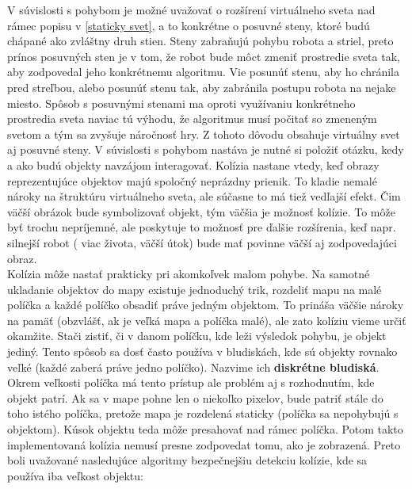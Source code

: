 V súvislosti s pohybom je možné uvažovať o rozšírení virtuálneho sveta nad rámec popisu v \ref{staticky svet}, a to konkrétne o posuvné steny, ktoré budú chápané ako zvláštny druh stien. Steny zabraňujú pohybu robota a striel, preto prínos posuvných sten je v tom, že robot bude môct zmeniť prostredie sveta tak, aby zodpovedal jeho konkrétnemu algoritmu. Vie posunúť stenu, aby ho chránila pred streľbou, alebo posunúť stenu tak, aby zabránila postupu robota na nejake miesto.
Spôsob s posuvnými stenami ma oproti využívaniu konkrétneho prostredia sveta naviac tú výhodu, že algoritmus musí počitať so zmeneným svetom a tým sa zvyšuje náročnosť hry. Z tohoto dôvodu obsahuje virtuálny svet aj posuvné steny.
 \label{Kolizie}
V súvislosti s pohybom nastáva je nutné si položiť otázku, kedy a ako budú objekty navzájom interagovať. Kolízia nastane vtedy, keď obrazy reprezentujúce objektov majú spoločný neprázdny prienik. To kladie nemalé nároky na štruktúru virtuálneho sveta, ale súčasne to má tiež vedľajší efekt. Čim väčší obrázok bude symbolizovať objekt, tým väčšia je možnosť kolízie. To môže byť trochu nepríjemné, ale poskytuje to možnosť pre ďalšie rozšírenia, keď napr. silnejší robot ( viac života, väčší útok) bude mať povinne väčší aj zodpovedajúci obraz. \\
\indent Kolízia môže nastať prakticky pri akomkoľvek malom pohybe. Na samotné ukladanie objektov do mapy existuje jednoduchý trik, rozdeliť mapu na malé políčka a každé políčko obsadiť práve jedným objektom. To prináša väčšie nároky na pamäť (obzvlášť, ak je veľká mapa a políčka malé), ale zato kolíziu vieme určiť okamžite. Stači zistiť, či v danom políčku, kde leži výsledok pohybu, je objekt jediný. Tento spôsob sa dosť často používa v bludiskách, kde sú objekty rovnako veľké (každé zaberá práve jedno políčko). Nazvime ich {\bf diskrétne bludiská}. Okrem veľkosti políčka má tento prístup ale problém aj s rozhodnutím, kde objekt patrí. Ak sa v mape pohne len o niekoľko pixelov, bude patriť stále do toho istého políčka, pretože mapa je rozdelená staticky (políčka sa nepohybujú s objektom). Kúsok objektu teda môže presahovať nad rámec políčka. Potom takto implementovaná kolízia nemusí presne zodpovedat tomu, ako je zobrazená. Preto boli uvažované nasledujúce algoritmy  bezpečnejšiu detekciu kolízie, kde sa používa iba veľkost objektu:
